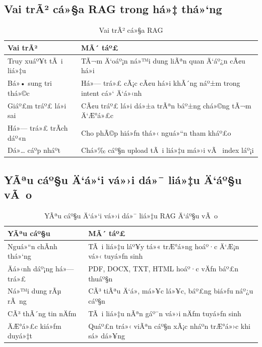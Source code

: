 ﻿\documentclass[12pt,a4paper]{report}
\begin{document}
\subsection{Vai trÃ² cá»§a RAG trong há»‡ thá»‘ng}
\begin{table}[H]
\centering
\caption{Vai trÃ² cá»§a RAG}
\label{tab:rag_roles}
\begin{tabular}{|p{4cm}|p{8cm}|}
\hline
\textbf{Vai trÃ²} & \textbf{MÃ´ táº£} \\ \hline
Truy xuáº¥t tÃ i liá»‡u & TÃ¬m Ä‘oáº¡n ná»™i dung liÃªn quan Ä‘áº¿n cÃ¢u há»i \\ \hline
Bá»• sung tri thá»©c & Há»— trá»£ cÃ¡c cÃ¢u há»i khÃ´ng náº±m trong intent cá»‘ Ä‘á»‹nh \\ \hline
Giáº£m tráº£ lá»i sai & CÃ¢u tráº£ lá»i dá»±a trÃªn báº±ng chá»©ng tÃ¬m Ä‘Æ°á»£c \\ \hline
Há»— trá»£ trÃ­ch dáº«n & Cho phÃ©p hiá»ƒn thá»‹ nguá»“n tham kháº£o \\ \hline
Dá»… cáº­p nháº­t & Chá»‰ cáº§n upload tÃ i liá»‡u má»›i vÃ  index láº¡i \\ \hline
\end{tabular}
\end{table}

\subsection{YÃªu cáº§u Ä‘á»‘i vá»›i dá»¯ liá»‡u Ä‘áº§u vÃ o}
\begin{table}[H]
\centering
\caption{YÃªu cáº§u Ä‘á»‘i vá»›i dá»¯ liá»‡u RAG Ä‘áº§u vÃ o}
\label{tab:rag_input_requirements}
\begin{tabular}{|p{4cm}|p{8cm}|}
\hline
\textbf{YÃªu cáº§u} & \textbf{MÃ´ táº£} \\ \hline
Nguá»“n chÃ­nh thá»‘ng & TÃ i liá»‡u láº¥y tá»« trÆ°á»ng hoáº·c Ä‘Æ¡n vá»‹ tuyá»ƒn sinh \\ \hline
Äá»‹nh dáº¡ng há»— trá»£ & PDF, DOCX, TXT, HTML hoáº·c vÄƒn báº£n thuáº§n \\ \hline
Ná»™i dung rÃµ rÃ ng & CÃ³ tiÃªu Ä‘á», má»¥c lá»¥c, báº£ng biá»ƒu náº¿u cáº§n \\ \hline
CÃ³ thÃ´ng tin nÄƒm & TÃ i liá»‡u nÃªn gáº¯n vá»›i nÄƒm tuyá»ƒn sinh \\ \hline
ÄÆ°á»£c kiá»ƒm duyá»‡t & Quáº£n trá»‹ viÃªn cáº§n xÃ¡c nháº­n trÆ°á»›c khi sá»­ dá»¥ng \\ \hline
\end{tabular}
\end{table}
\end{document}
